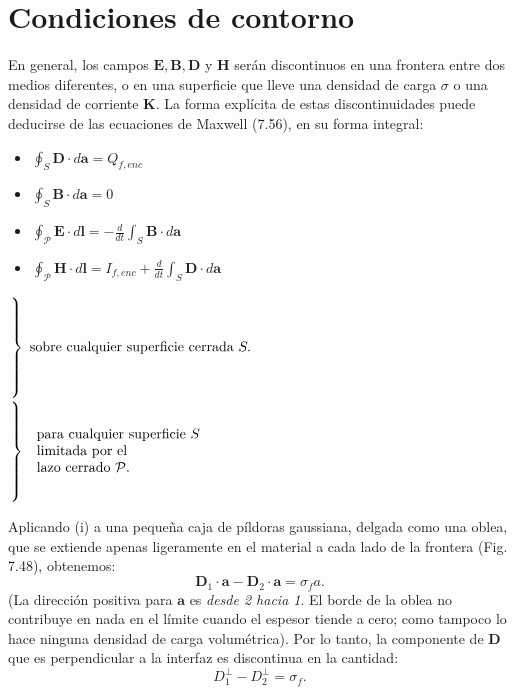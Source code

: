 \documentclass[12pt,a4paper]{report}
\begin{document}
	\section{Condiciones de contorno}
	
	En general, los campos $\mathbf{E, B, D}$ y $\mathbf{H}$ serán discontinuos en una frontera entre dos medios diferentes, o en una superficie que lleve una densidad de carga $\sigma$ o una densidad de corriente $\mathbf{K}$. La forma explícita de estas discontinuidades puede deducirse de las ecuaciones de Maxwell (7.56), en su forma integral:
	
	\begin{itemize}
		\item[(i)] $\displaystyle \oint_S \mathbf{D} \cdot d\mathbf{a} = Q_{f, enc}$
		\item[(ii)] $\displaystyle \oint_S \mathbf{B} \cdot d\mathbf{a} = 0$
		\item[(iii)] $\displaystyle \oint_{\mathcal{P}} \mathbf{E} \cdot d\mathbf{l} = -\frac{d}{dt} \int_S \mathbf{B} \cdot d\mathbf{a}$
		\item[(iv)] $\displaystyle \oint_{\mathcal{P}} \mathbf{H} \cdot d\mathbf{l} = I_{f, enc} + \frac{d}{dt} \int_S \mathbf{D} \cdot d\mathbf{a}$
	\end{itemize}
	\vspace{-1.5em}
	\begin{flushright}
		$\left. \text{\rule{0pt}{4em}} \right\} \text{ sobre cualquier superficie cerrada } S.$ \\
		$\left. \text{\rule{0pt}{4em}} \right\} \begin{array}{l} \text{ para cualquier superficie } S \\ \text{ limitada por el} \\ \text{ lazo cerrado } \mathcal{P}. \end{array}$
	\end{flushright}
	
	Aplicando (i) a una pequeña caja de píldoras gaussiana, delgada como una oblea, que se extiende apenas ligeramente en el material a cada lado de la frontera (Fig. 7.48), obtenemos:
	\begin{equation*}
		\mathbf{D}_1 \cdot \mathbf{a} - \mathbf{D}_2 \cdot \mathbf{a} = \sigma_f a.
	\end{equation*}
	(La dirección positiva para $\mathbf{a}$ es \textit{desde 2 hacia 1}. El borde de la oblea no contribuye en nada en el límite cuando el espesor tiende a cero; como tampoco lo hace ninguna densidad de carga volumétrica). Por lo tanto, la componente de $\mathbf{D}$ que es perpendicular a la interfaz es discontinua en la cantidad:
	\begin{equation}
		D_1^{\perp} - D_2^{\perp} = \sigma_f. \tag{7.60}
	\end{equation}
	
\end{document}
